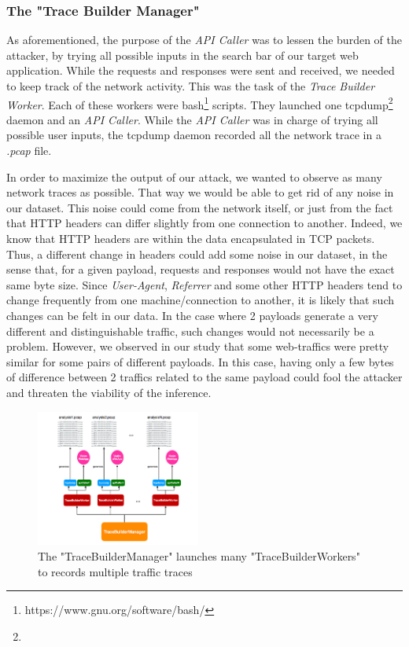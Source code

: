 \documentclass[journal]{IEEEtran}
\begin{document}
\bigskip

\subsubsection*{The "Trace Builder Manager"}

As aforementioned, the purpose of the \emph{API Caller} was to lessen the burden of the attacker, by trying all possible inputs in the search bar of our target web application. While the requests and responses were sent and received, we needed to keep track of the network activity. This was the task of the \emph{Trace Builder Worker}. Each of these workers were bash\footnote{https://www.gnu.org/software/bash/} scripts. They launched one tcpdump\footnote{} daemon and an \emph{API Caller}. While the \emph{API Caller} was in charge of trying all possible user inputs, the tcpdump daemon recorded all the network trace in a \emph{.pcap} file.

\medskip

In order to maximize the output of our attack, we wanted to observe as many network traces as possible. That way we would be able to get rid of any noise in our dataset. This noise could come from the network itself, or just from the fact that HTTP headers can differ slightly from one connection to another. Indeed, we know that HTTP headers are within the data encapsulated in TCP packets. Thus, a different change in headers could add some noise in our dataset, in the sense that, for a given payload, requests and responses would not have the exact same byte size. Since \emph{User-Agent}, \emph{Referrer} and some other HTTP headers tend to change frequently from one machine/connection to another, it is likely that such changes can be felt in our data. In the case where 2 payloads generate a very different and distinguishable traffic, such changes would not necessarily be a problem. However, we observed in our study that some web-traffics were pretty similar for some pairs of different payloads. In this case, having only a few bytes of difference between 2 traffics related to the same payload could fool the attacker and threaten the viability of the inference.

\begin{figure}[h]
\centering
\includegraphics[width=0.48\textwidth]{images/traceBuilderManager.png}
\caption{The "TraceBuilderManager" launches many "TraceBuilderWorkers" to records multiple traffic traces}
\label{fig:traceBuilderManager}
\end{figure}
\end{document}

